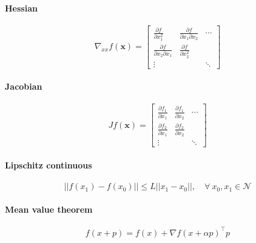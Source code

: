 \paragraph{Hessian}
\begin{equation}
  \nabla_{xx} f(\mathbf{x}) = \begin{bmatrix}
    \frac{\partial f}{\partial x_1^2} & \frac{\partial f}{\partial x_1 \partial x_2} & \cdots\\
    \frac{\partial f}{\partial x_2 \partial x_1} & \frac{\partial f}{\partial x_2^2} &\\
    \vdots & & \ddots
  \end{bmatrix}
\end{equation}

\paragraph{Jacobian}
\begin{equation}
  J f(\mathbf{x}) = \begin{bmatrix}
    \frac{\partial f_1}{\partial x_1} & \frac{\partial f_1}{\partial x_2} & \cdots\\
    \frac{\partial f_2}{\partial x_1} & \frac{\partial f_2}{\partial x_2} &\\
    \vdots & & \ddots
  \end{bmatrix}
\end{equation}


\paragraph{Lipschitz continuous}
\begin{equation}
  || f(x_1) - f(x_0) || \leq L || x_1 - x_0 ||, \quad \forall \: x_0, x_1 \in \mathcal{N}
\end{equation}

\paragraph{Mean value theorem}
\begin{equation}
  f(x+p) = f(x) + \nabla f(x + \alpha p)^\top p
\end{equation}